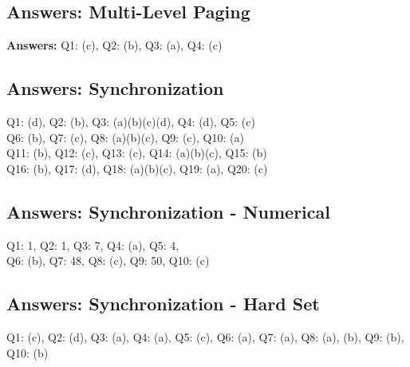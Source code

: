 
\subsection*{Answers: Multi-Level Paging}
\noindent\textbf{Answers:} Q1: (c), Q2: (b), Q3: (a), Q4: (c)

\subsection*{Answers: Synchronization}
\noindent
Q1: (d), Q2: (b), Q3: (a)(b)(c)(d), Q4: (d), Q5: (c)\\
Q6: (b), Q7: (c), Q8: (a)(b)(c), Q9: (c), Q10: (a)\\
Q11: (b), Q12: (c), Q13: (c), Q14: (a)(b)(c), Q15: (b)\\
Q16: (b), Q17: (d), Q18: (a)(b)(c), Q19: (a), Q20: (c)

\subsection*{Answers: Synchronization - Numerical}
\noindent
Q1: 1,\quad
Q2: 1,\quad
Q3: 7,\quad
Q4: (a),\quad
Q5: 4,\quad \\
Q6: (b),\quad
Q7: 48,\quad
Q8: (c),\quad
Q9: 50,\quad
Q10: (c)

\subsection*{Answers: Synchronization - Hard Set}
\noindent
Q1: (c), \quad
Q2: (d), \quad
Q3: (a), \quad
Q4: (a), \quad
Q5: (c), \quad
Q6: (a), \quad
Q7: (a), \quad
Q8: (a), (b), \quad
Q9: (b), \quad
Q10: (b)